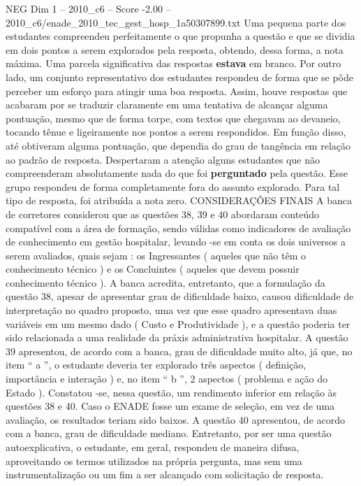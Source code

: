 \begin{textsample}{NEG Dim 1 – 2010\_c6 – Score -2.00 – 2010\_c6/enade\_2010\_tec\_gest\_hosp\_1a50307899.txt}
Uma pequena parte dos estudantes compreendeu perfeitamente o que propunha a questão e que se dividia em dois pontos a serem explorados pela resposta, obtendo, dessa forma, a nota máxima.
Uma parcela significativa das respostas \textbf{estava} em branco.
Por outro lado, um conjunto representativo dos estudantes respondeu de forma que se pôde perceber um esforço para atingir uma boa resposta.
Assim, houve respostas que acabaram por se traduzir claramente em uma tentativa de alcançar alguma pontuação, mesmo que de forma torpe, com textos que chegavam ao devaneio, tocando tênue e ligeiramente nos pontos a serem respondidos.
Em função disso, até obtiveram alguma pontuação, que dependia do grau de tangência em relação ao padrão de resposta.
Despertaram a atenção alguns estudantes que não compreenderam absolutamente nada do que foi \textbf{perguntado} pela questão.
Esse grupo respondeu de forma completamente fora do assunto explorado.
Para tal tipo de resposta, foi atribuída a nota zero.
CONSIDERAÇÕES FINAIS A banca de corretores considerou que as questões 38, 39 e 40 abordaram conteúdo compatível com a área de formação, sendo válidas como indicadores de avaliação de conhecimento em gestão hospitalar, levando -se em conta os dois universos a serem avaliados, quais sejam : os Ingressantes ( aqueles que não têm o conhecimento técnico ) e os Concluintes ( aqueles que devem possuir conhecimento técnico ).
A banca acredita, entretanto, que a formulação da questão 38, apesar de apresentar grau de dificuldade baixo, causou dificuldade de interpretação no quadro proposto, uma vez que esse quadro apresentava duas variáveis em um mesmo dado ( Custo e Produtividade ), e a questão poderia ter sido relacionada a uma realidade da práxis administrativa hospitalar.
A questão 39 apresentou, de acordo com a banca, grau de dificuldade muito alto, já que, no item “ a ”, o estudante deveria ter explorado três aspectos ( definição, importância e interação ) e, no item “ b ”, 2 aspectos ( problema e ação do Estado ).
Constatou -se, nessa questão, um rendimento inferior em relação às questões 38 e 40.
Caso o ENADE fosse um exame de seleção, em vez de uma avaliação, os resultados teriam sido baixos.
A questão 40 apresentou, de acordo com a banca, grau de dificuldade mediano.
Entretanto, por ser uma questão autoexplicativa, o estudante, em geral, respondeu de maneira difusa, aproveitando os termos utilizados na própria pergunta, mas sem uma instrumentalização ou um fim a ser alcançado com solicitação de resposta.

\end{textsample}
